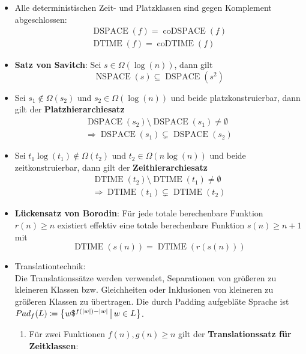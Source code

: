 \documentclass[landscape, 8pt, a4paper]{extarticle}
\newcommand{\set}[2]{\ensuremath\left\{ #1 \,\middle|\, #2 \right\}}
\begin{document}
\begin{multicols}{3}
\begin{itemize}
\begin{equation*}
		\end{equation*}
		\item Alle deterministischen Zeit- und Platzklassen sind gegen Komplement abgeschlossen:
		\begin{gather*}
			\operatorname{DSPACE}(f)=\operatorname{coDSPACE}(f)\\
			\operatorname{DTIME}(f)=\operatorname{coDTIME}(f)
		\end{gather*}
		\item \textbf{Satz von Savitch}: Sei $s\in\Omega(\log(n))$, dann gilt
		\begin{equation*}
			\operatorname{NSPACE}(s)\subseteq\operatorname{DSPACE}(s^2)
		\end{equation*}
		\item Sei $s_1\not\in\Omega(s_2)$ und $s_2\in\Omega(\log(n))$ und beide platzkonstruierbar, dann gilt der \textbf{Platzhierarchiesatz}
		\begin{gather*}
			\operatorname{DSPACE}(s_2)\setminus\operatorname{DSPACE}(s_1)\not=\emptyset\\
			\Rightarrow \operatorname{DSPACE}(s_1)\subsetneq\operatorname{DSPACE}(s_2)
		\end{gather*}
		\item Sei $t_1\log(t_1)\not\in\Omega(t_2)$ und $t_2\in\Omega(n\log(n))$ und beide zeitkonstruierbar, dann gilt der \textbf{Zeithierarchiesatz}
		\begin{gather*}
			\operatorname{DTIME}(t_2)\setminus\operatorname{DTIME}(t_1)\not=\emptyset\\
			\Rightarrow \operatorname{DTIME}(t_1)\subsetneq \operatorname{DTIME}(t_2)
		\end{gather*}
		\item \textbf{Lückensatz von Borodin}: Für jede totale berechenbare Funktion $r(n)\geq n$ existiert effektiv eine totale berechenbare Funktion $s(n)\geq n+1$ mit
		\begin{equation*}
			\operatorname{DTIME}(s(n))=\operatorname{DTIME}(r(s(n)))
		\end{equation*}
		\item Translationtechnik:\\
		Die Translationssätze werden verwendet, Separationen von größeren zu kleineren Klassen bzw. Gleichheiten oder Inklusionen von kleineren zu größeren Klassen zu übertragen.
		Die durch Padding aufgebläte Sprache ist $Pad_f(L)\coloneqq \set{w\$^{f(|w|)-|w|}}{w\in L}$.
		\begin{enumerate}
			\item Für zwei Funktionen $f(n),g(n)\geq n$ gilt der \textbf{Translationssatz für Zeitklassen}:

\end{enumerate}
\end{itemize}
\end{multicols}
\end{document}
